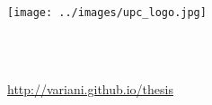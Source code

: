 \begin{titlepage}

  
	\begin{addmargin}[-1cm]{-3cm}
    \begin{center}
        \large  

        \hfill

        \vfill
        
         \\
        \begingroup
            \color{Maroon}\spacedallcaps{\myTitleOne} \\
            \color{Maroon}\spacedallcaps{\myTitleTwo} \\  
            \bigskip
        \endgroup

         \\
         \\
        
        \vfill

        \texttt{[image: ../images/upc\_logo.jpg]} \\ \medskip

        \myDepartment \\                            
        \myUni \\ \bigskip
        
        \href{http://variani.github.io/thesis}{http://variani.github.io/thesis} \\
        \myTime

        \vfill                      

    \end{center}  
  \end{addmargin}       
\end{titlepage}   
